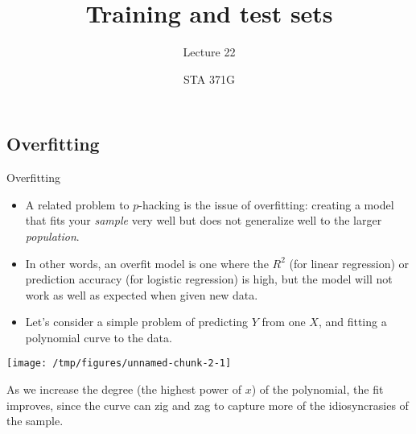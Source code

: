 \documentclass{beamer}\usepackage[]{graphicx}\usepackage[]{color}
\title{Training and test sets}
\subtitle{Lecture 22}
\author{STA 371G}
\makeatletter
\def\maxwidth{ %
  \ifdim\Gin@nat@width>\linewidth
    \linewidth
  \else
    \Gin@nat@width
  \fi
}
\newenvironment{knitrout}{}{} %
\makeatother
\begin{document}
  
  

  \frame{\maketitle}



  \begin{darkframes}
    \section{Overfitting}

    \begin{frame}{Overfitting}
      \begin{itemize}
        \item A related problem to $p$-hacking is the issue of \alert{overfitting}: creating a model that fits your \emph{sample} very well but does not generalize well to the larger \emph{population}.
        \item In other words, an overfit model is one where the $R^2$ (for linear regression) or prediction accuracy (for logistic regression) is high, but the model will not work as well as expected when given new data.
        \item Let's consider a simple problem of predicting $Y$ from one $X$, and fitting a polynomial curve to the data.
      \end{itemize}
    \end{frame}

    \begin{frame}
\begin{knitrout}
\color{fgcolor}
\texttt{[image: /tmp/figures/unnamed-chunk-2-1]} 

\end{knitrout}

      \pause
      \vspace{-1cm}
      As we increase the degree (the highest power of $x$) of the polynomial, the fit improves, since the curve can zig and zag to capture more of the idiosyncrasies of the sample.
    \end{frame}

    \begin{frame}
    \end{frame}


\end{darkframes}
\end{document}

